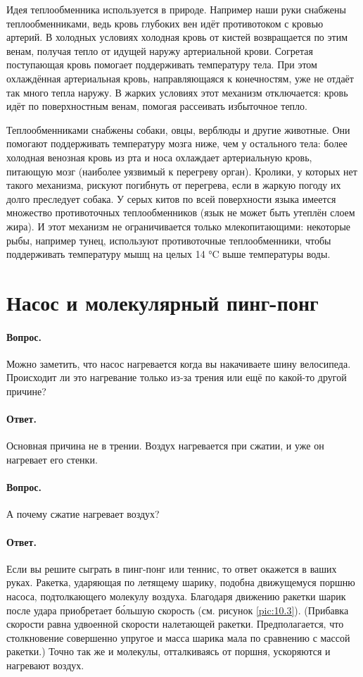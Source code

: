 Идея теплообменника используется в природе.
Например наши руки снабжены теплообменниками, ведь кровь глубоких вен идёт противотоком с кровью артерий.
В холодных условиях холодная кровь от кистей возвращается по этим венам, получая тепло от идущей наружу артериальной крови. Согретая поступающая кровь помогает поддерживать температуру тела.
При этом охлаждённая артериальная кровь, направляющаяся к конечностям, уже не отдаёт так много тепла наружу.
В жарких условиях этот механизм отключается: кровь идёт по поверхностным венам, помогая рассеивать избыточное тепло.

Теплообменниками снабжены собаки, овцы, верблюды и другие животные.
Они помогают поддерживать температуру мозга ниже, чем у остального тела: более холодная венозная кровь из рта и носа охлаждает артериальную кровь, питающую мозг (наиболее уязвимый к перегреву орган).
Кролики, у которых нет такого механизма, рискуют погибнуть от перегрева, если в жаркую погоду их долго преследует собака.
У серых китов по всей поверхности языка имеется множество противоточных теплообменников (язык не может быть утеплён слоем жира).
И этот механизм не ограничивается только млекопитающими: некоторые рыбы, например тунец, используют противоточные теплообменники, чтобы поддерживать температуру мышц на целых 14 °C выше температуры воды.

\section{Насос и молекулярный пинг-понг}

\paragraph{Вопрос.}
Можно заметить, что насос нагревается когда вы накачиваете шину велосипеда.
Происходит ли это нагревание только из-за трения или ещё по какой-то другой причине?

\paragraph{Ответ.}
Основная причина не в трении.
Воздух нагревается при сжатии, и уже он нагревает его стенки.

\paragraph{Вопрос.} А почему сжатие нагревает воздух?

\paragraph{Ответ.}
Если вы решите сыграть в пинг-понг или теннис, то ответ окажется в ваших руках.
Ракетка, ударяющая по летящему шарику, подобна движущемуся поршню насоса, подтолкающего молекулу воздуха.
Благодаря движению ракетки шарик после удара приобретает б\'{о}льшую скорость (см. рисунок \ref{pic:10.3}).
(Прибавка скорости равна удвоенной скорости налетающей ракетки.
Предполагается, что столкновение совершенно упругое и масса шарика мала по сравнению с массой ракетки.)
Точно так же и молекулы, отталкиваясь от поршня, ускоряются и нагревают воздух.

